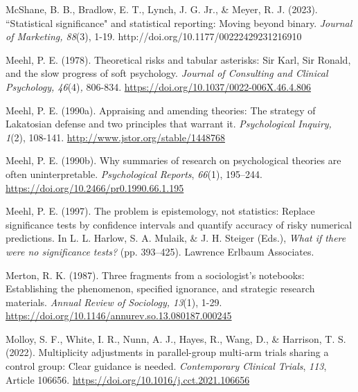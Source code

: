 \documentclass[authordate, empirical]{jote-new-article}
\begin{document}
	McShane, B. B., Bradlow, E. T., Lynch, J. G. Jr., \& Meyer, R. J. (2023). “Statistical significance" and statistical reporting: Moving beyond binary. \emph{Journal of Marketing, 88}(3), 1-19. http://doi.org/10.1177/00222429231216910



	Meehl, P. E. (1978). Theoretical risks and tabular asterisks: Sir Karl, Sir Ronald, and the slow progress of soft psychology. \emph{Journal of Consulting and Clinical Psychology, 46}(4)\emph{,} 806-834. \href{https://doi.org/10.1037/0022-006X.46.4.806}{https://doi.org/10.1037/0022-006X.46.4.806}



	Meehl, P. E. (1990a). Appraising and amending theories: The strategy of Lakatosian defense and two principles that warrant it. \emph{Psychological Inquiry, 1}(2), 108-141. \href{http://www.jstor.org/stable/1448768}{http://www.jstor.org/stable/1448768}



	Meehl, P. E. (1990b). Why summaries of research on psychological theories are often uninterpretable. \emph{Psychological Reports}, \emph{66}(1), 195--244. \href{https://doi.org/10.2466/pr0.1990.66.1.195}{https://doi.org/10.2466/pr0.1990.66.1.195}



	Meehl, P. E. (1997). The problem is epistemology, not statistics: Replace significance tests by confidence intervals and quantify accuracy of risky numerical predictions. In L. L. Harlow, S. A. Mulaik, \& J. H. Steiger (Eds.), \emph{What if there were no significance tests?} (pp. 393--425). Lawrence Erlbaum Associates.



	Merton, R. K. (1987). Three fragments from a sociologist's notebooks: Establishing the phenomenon, specified ignorance, and strategic research materials. \emph{Annual Review of Sociology, 13}(1), 1-29. \href{https://doi.org/10.1146/annurev.so.13.080187.000245}{https://doi.org/10.1146/annurev.so.13.080187.000245}



	Molloy, S. F., White, I. R., Nunn, A. J., Hayes, R., Wang, D., \& Harrison, T. S. (2022). Multiplicity adjustments in parallel-group multi-arm trials sharing a control group: Clear guidance is needed. \emph{Contemporary Clinical Trials}, \emph{113}, Article 106656. \href{https://doi.org/10.1016/j.cct.2021.106656}{https://doi.org/10.1016/j.cct.2021.106656}
\end{document}
